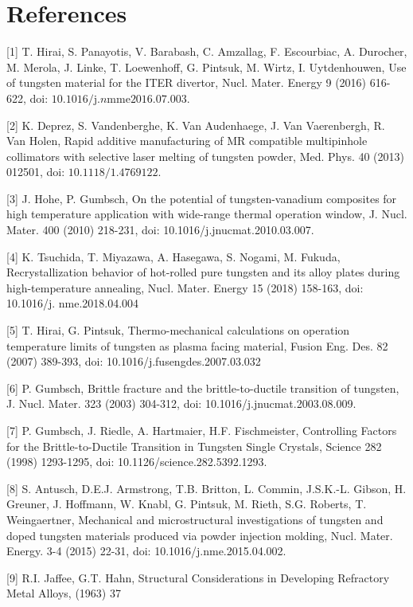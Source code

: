 \documentclass[10pt]{article}
\begin{document}
\section*{References}
[1] T. Hirai, S. Panayotis, V. Barabash, C. Amzallag, F. Escourbiac, A. Durocher, M. Merola, J. Linke, T. Loewenhoff, G. Pintsuk, M. Wirtz, I. Uytdenhouwen, Use of tungsten material for the ITER divertor, Nucl. Mater. Energy 9 (2016) 616-622, doi: $10.1016 / \mathrm{j} . n \mathrm{mme} 2016.07 .003$.

[2] K. Deprez, S. Vandenberghe, K. Van Audenhaege, J. Van Vaerenbergh, R. Van Holen, Rapid additive manufacturing of MR compatible multipinhole collimators with selective laser melting of tungsten powder, Med. Phys. 40 (2013) 012501, doi: $10.1118 / 1.4769122$.

[3] J. Hohe, P. Gumbsch, On the potential of tungsten-vanadium composites for high temperature application with wide-range thermal operation window, J. Nucl. Mater. 400 (2010) 218-231, doi: 10.1016/j.jnucmat.2010.03.007.

[4] K. Tsuchida, T. Miyazawa, A. Hasegawa, S. Nogami, M. Fukuda, Recrystallization behavior of hot-rolled pure tungsten and its alloy plates during high-temperature annealing, Nucl. Mater. Energy 15 (2018) 158-163, doi: 10.1016/j. nme.2018.04.004

[5] T. Hirai, G. Pintsuk, Thermo-mechanical calculations on operation temperature limits of tungsten as plasma facing material, Fusion Eng. Des. 82 (2007) 389-393, doi: 10.1016/j.fusengdes.2007.03.032

[6] P. Gumbsch, Brittle fracture and the brittle-to-ductile transition of tungsten, J. Nucl. Mater. 323 (2003) 304-312, doi: 10.1016/j.jnucmat.2003.08.009.

[7] P. Gumbsch, J. Riedle, A. Hartmaier, H.F. Fischmeister, Controlling Factors for the Brittle-to-Ductile Transition in Tungsten Single Crystals, Science 282 (1998) 1293-1295, doi: 10.1126/science.282.5392.1293.

[8] S. Antusch, D.E.J. Armstrong, T.B. Britton, L. Commin, J.S.K.-L. Gibson, H. Greuner, J. Hoffmann, W. Knabl, G. Pintsuk, M. Rieth, S.G. Roberts, T. Weingaertner, Mechanical and microstructural investigations of tungsten and doped tungsten materials produced via powder injection molding, Nucl. Mater. Energy. 3-4 (2015) 22-31, doi: 10.1016/j.nme.2015.04.002.

[9] R.I. Jaffee, G.T. Hahn, Structural Considerations in Developing Refractory Metal Alloys, (1963) 37
\end{document}
